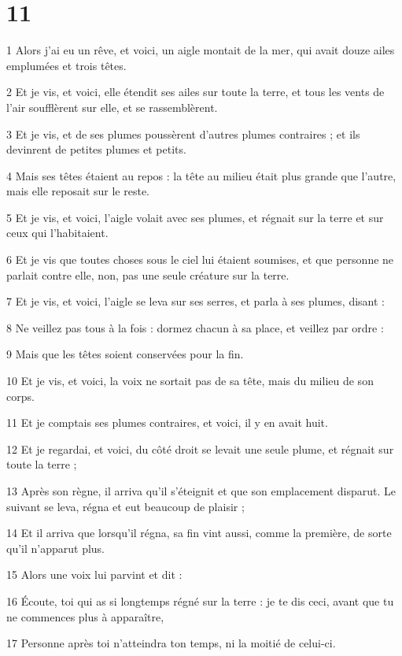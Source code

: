 \chapter{11}

\par 1 Alors j'ai eu un rêve, et voici, un aigle montait de la mer, qui avait douze ailes emplumées et trois têtes.
\par 2 Et je vis, et voici, elle étendit ses ailes sur toute la terre, et tous les vents de l'air soufflèrent sur elle, et se rassemblèrent.
\par 3 Et je vis, et de ses plumes poussèrent d'autres plumes contraires ; et ils devinrent de petites plumes et petits.
\par 4 Mais ses têtes étaient au repos : la tête au milieu était plus grande que l'autre, mais elle reposait sur le reste.
\par 5 Et je vis, et voici, l'aigle volait avec ses plumes, et régnait sur la terre et sur ceux qui l'habitaient.
\par 6 Et je vis que toutes choses sous le ciel lui étaient soumises, et que personne ne parlait contre elle, non, pas une seule créature sur la terre.
\par 7 Et je vis, et voici, l'aigle se leva sur ses serres, et parla à ses plumes, disant :
\par 8 Ne veillez pas tous à la fois : dormez chacun à sa place, et veillez par ordre :
\par 9 Mais que les têtes soient conservées pour la fin.
\par 10 Et je vis, et voici, la voix ne sortait pas de sa tête, mais du milieu de son corps.
\par 11 Et je comptais ses plumes contraires, et voici, il y en avait huit.
\par 12 Et je regardai, et voici, du côté droit se levait une seule plume, et régnait sur toute la terre ;
\par 13 Après son règne, il arriva qu'il s'éteignit et que son emplacement disparut. Le suivant se leva, régna et eut beaucoup de plaisir ;
\par 14 Et il arriva que lorsqu'il régna, sa fin vint aussi, comme la première, de sorte qu'il n'apparut plus.
\par 15 Alors une voix lui parvint et dit :
\par 16 Écoute, toi qui as si longtemps régné sur la terre : je te dis ceci, avant que tu ne commences plus à apparaître,
\par 17 Personne après toi n'atteindra ton temps, ni la moitié de celui-ci.
